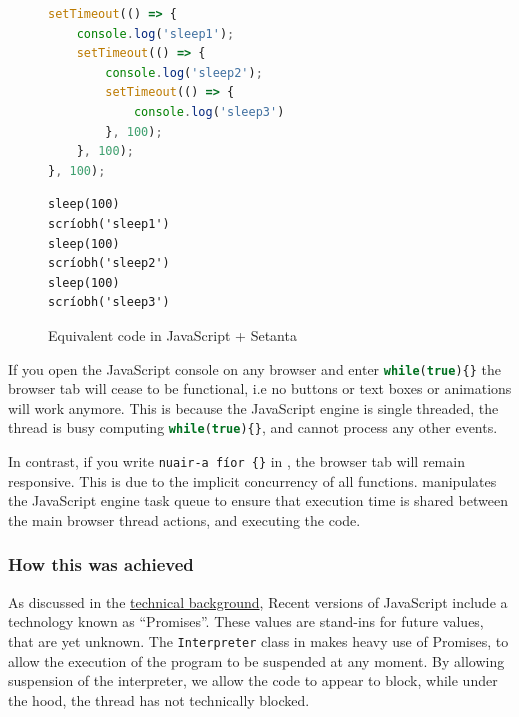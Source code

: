 \begin{figure}[ht]
    \begin{minipage}[t]{0.45\textwidth}
        \begin{lstlisting}[language=javascript, caption=JavaScript]
setTimeout(() => {
    console.log('sleep1');
    setTimeout(() => {
        console.log('sleep2');
        setTimeout(() => {
            console.log('sleep3')
        }, 100);
    }, 100);
}, 100);
        \end{lstlisting}
    \end{minipage}\qquad
    \begin{minipage}[t]{0.45\textwidth}
        \begin{lstlisting}[language=setanta, caption=Setanta]
sleep(100)
scríobh('sleep1')
sleep(100)
scríobh('sleep2')
sleep(100)
scríobh('sleep3')
        \end{lstlisting}
    \end{minipage}
    \caption{Equivalent code in JavaScript + Setanta}
    \label{blockingcomparison}
\end{figure}

If you open the JavaScript console on any browser and enter \lstinline[language=javascript]|while(true){}| the browser tab will cease to be functional, i.e no buttons or text boxes or animations will work anymore.
This is because the JavaScript engine is single threaded, the thread is busy computing \lstinline[language=javascript]|while(true){}|, and cannot process any other events.

In contrast, if you write \lstinline[language=setanta]|nuair-a fíor {}| in \Setanta{}, the browser tab will remain responsive. This is due to the implicit concurrency of all \Setanta{} functions. \Setanta{} manipulates the JavaScript engine task queue to ensure that execution time is shared between the main browser thread actions, and executing the \Setanta{} code.

\subsubsection{How this was achieved}

As discussed in the \hyperref[background:asyncawait]{technical background}, Recent versions of JavaScript include a technology known as ``Promises''. These values are stand-ins for future values, that are yet unknown. The \verb|Interpreter| class in \Setanta{} makes heavy use of Promises, to allow the execution of the program to be suspended at any moment. By allowing suspension of the interpreter, we allow the code to appear to block, while under the hood, the thread has not technically blocked.

